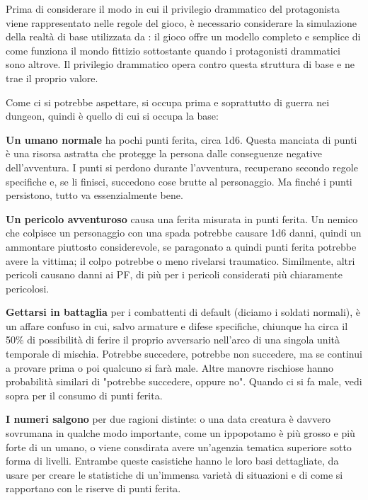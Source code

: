 
Prima di considerare il modo in cui il privilegio drammatico del protagonista viene rappresentato nelle regole del gioco, è necessario considerare la simulazione della realtà di base utilizzata da \dnd{}: il gioco offre un modello completo e semplice di come funziona il mondo fittizio sottostante quando i protagonisti drammatici sono altrove. Il privilegio drammatico opera contro questa struttura di base e ne trae il proprio valore.

Come ci si potrebbe aspettare, \dnd{} si occupa prima e soprattutto di guerra nei dungeon, quindi è quello di cui si occupa la base:

\textbf{Un umano normale} ha pochi punti ferita, circa 1d6. Questa manciata di punti è una risorsa astratta che protegge la persona dalle conseguenze negative dell'avventura. I punti si perdono durante l'avventura, recuperano secondo regole specifiche e, se li finisci, succedono cose brutte al personaggio. Ma finché i punti persistono, tutto va essenzialmente bene.

\textbf{Un pericolo avventuroso} causa una ferita misurata in punti ferita. Un nemico che colpisce un personaggio con una spada potrebbe causare 1d6 danni, quindi un ammontare piuttosto considerevole, se paragonato a quindi punti ferita potrebbe avere la vittima; il colpo potrebbe o meno rivelarsi traumatico. Similmente, altri pericoli causano danni ai PF, di più per i pericoli considerati più chiaramente pericolosi.

\textbf{Gettarsi in battaglia} per i combattenti di default (diciamo i soldati normali), è un affare confuso in cui, salvo armature e difese specifiche, chiunque ha circa il 50\% di possibilità di ferire il proprio avversario nell'arco di una singola unità temporale di mischia. Potrebbe succedere, potrebbe non succedere, ma se continui a provare prima o poi qualcuno si farà male. Altre manovre rischiose hanno probabilità similari di "potrebbe succedere, oppure no". Quando ci si fa male, vedi sopra per il consumo di punti ferita.

\textbf{I numeri salgono} per due ragioni distinte: o una data creatura è davvero sovrumana in qualche modo importante, come un ippopotamo è più grosso e più forte di un umano, o viene consdirata avere un'agenzia tematica superiore sotto forma di livelli. Entrambe queste casistiche hanno le loro basi dettagliate, da usare per creare le statistiche di un'immensa varietà di situazioni e di come si rapportano con le riserve di punti ferita.

